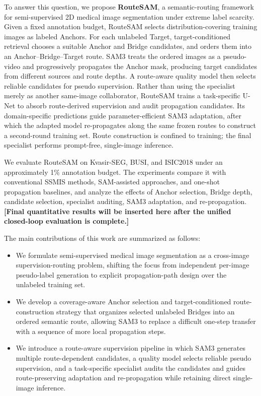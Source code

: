\documentclass[a4paper,fleqn]{cas-dc}
\begin{document}
To answer this question, we propose \textbf{RouteSAM}, a semantic-routing framework for semi-supervised 2D medical image segmentation under extreme label scarcity. Given a fixed annotation budget, RouteSAM selects distribution-covering training images as labeled Anchors. For each unlabeled Target, target-conditioned retrieval chooses a suitable Anchor and Bridge candidates, and orders them into an Anchor--Bridge--Target route. SAM3 treats the ordered images as a pseudo-video and progressively propagates the Anchor mask, producing target candidates from different sources and route depths. A route-aware quality model then selects reliable candidates for pseudo supervision. Rather than using the specialist merely as another same-image collaborator, RouteSAM trains a task-specific U-Net to absorb route-derived supervision and audit propagation candidates. Its domain-specific predictions guide parameter-efficient SAM3 adaptation, after which the adapted model re-propagates along the same frozen routes to construct a second-round training set. Route construction is confined to training; the final specialist performs prompt-free, single-image inference.

We evaluate RouteSAM on Kvasir-SEG, BUSI, and ISIC2018 under an approximately 1\% annotation budget. The experiments compare it with conventional SSMIS methods, SAM-assisted approaches, and one-shot propagation baselines, and analyze the effects of Anchor selection, Bridge depth, candidate selection, specialist auditing, SAM3 adaptation, and re-propagation. \textbf{[Final quantitative results will be inserted here after the unified closed-loop evaluation is complete.]}

The main contributions of this work are summarized as follows:
\begin{itemize}
\item We formulate semi-supervised medical image segmentation as a cross-image supervision-routing problem, shifting the focus from independent per-image pseudo-label generation to explicit propagation-path design over the unlabeled training set.

\item We develop a coverage-aware Anchor selection and target-conditioned route-construction strategy that organizes selected unlabeled Bridges into an ordered semantic route, allowing SAM3 to replace a difficult one-step transfer with a sequence of more local propagation steps.

\item We introduce a route-aware supervision pipeline in which SAM3 generates multiple route-dependent candidates, a quality model selects reliable pseudo supervision, and a task-specific specialist audits the candidates and guides route-preserving adaptation and re-propagation while retaining direct single-image inference.
\end{itemize}
\end{document}
